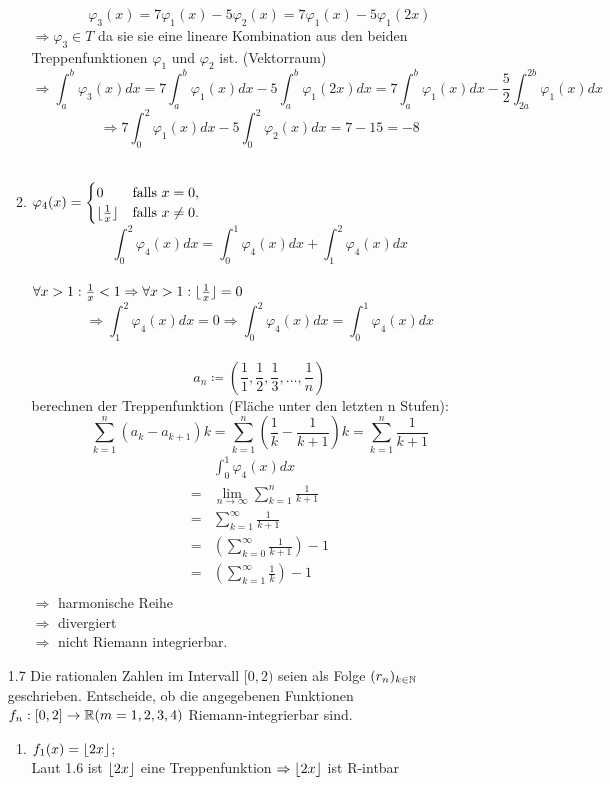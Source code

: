 \documentclass{HM}
\begin{document}
\begin{enumerate}
\begin{enumerate}
				$$\varphi_3(x)=7\varphi_1(x)-5\varphi_2(x)=7\varphi_1(x)-5\varphi_1(2x)$$
				$\Rightarrow \varphi_3\in T$ da sie sie eine lineare Kombination aus den beiden Treppenfunktionen $\varphi_1$ und $\varphi_2$ ist. (Vektorraum)
				$$\Rightarrow \int_a^b\varphi_3(x)dx=
				7\int_a^b\varphi_1(x)dx-5\int_a^b\varphi_1(2x)dx=
				7\int_a^b\varphi_1(x)dx-\frac{5}{2}\int_{2a}^{2b}\varphi_1(x)dx$$
				$$\Rightarrow 7\int_0^2\varphi_1(x)dx-5\int_0^2\varphi_2(x)dx=7-15=-8$$\\
			\item $\varphi_4(x)=\begin{cases}
				0&\text{falls }x=0,\\
				\lfloor\frac{1}{x}\rfloor&\text{falls }x\neq 0.
			\end{cases}$
			$$\int_0^2\varphi_4(x)dx=\int_0^1\varphi_4(x)dx+\int_1^2\varphi_4(x)dx$$\\
			$\forall x>1:\frac{1}{x}<1\Rightarrow\forall x>1:\lfloor\frac{1}{x}\rfloor=0$
			$$\Rightarrow\int_1^2\varphi_4(x)dx=0\Rightarrow\int_0^2\varphi_4(x)dx=\int_0^1\varphi_4(x)dx$$\\
			$$a_n\coloneqq\left(\frac{1}{1},\frac{1}{2},\frac{1}{3},\hdots,\frac{1}{n}\right)$$
			berechnen der Treppenfunktion (Fläche unter den letzten n Stufen): $$\sum_{k=1}^n(a_k-a_{k+1})k=\sum_{k=1}^n(\frac{1}{k}-\frac{1}{k+1})k=\sum_{k=1}^n\frac{1}{k+1}$$
			\begin{align*}
				&\int_0^1\varphi_4(x)dx\\
				=&\lim\limits_{n\to\infty}\sum_{k=1}^n\frac{1}{k+1}\\
				=&\sum\limits_{k=1}^\infty\frac{1}{k+1}\\
				=&\left(\sum\limits_{k=0}^\infty\frac{1}{k+1}\right)-1\\
				=&\left(\sum\limits_{k=1}^\infty\frac{1}{k}\right)-1\\
			\end{align*}
			$\Rightarrow$ harmonische Reihe\\
			$\Rightarrow$ divergiert\\
			$\Rightarrow$ nicht Riemann integrierbar.
		\end{enumerate}

		\item[1.7] Die rationalen Zahlen im Intervall $[0,2)$ seien als Folge $(r_n)_{k\in\mathbb{N}}$ geschrieben. Entscheide, ob die angegebenen Funktionen $f_n:[0,2]\to\mathbb{R}(m=1,2,3,4)$ Riemann-integrierbar sind.
		\begin{enumerate}
			\item $f_1(x)=\lfloor2x\rfloor$;\\
			Laut 1.6 ist $\lfloor2x\rfloor$ eine Treppenfunktion $\Rightarrow \lfloor2x\rfloor$ ist R-intbar\\


\end{enumerate}
\end{enumerate}
\end{document}
